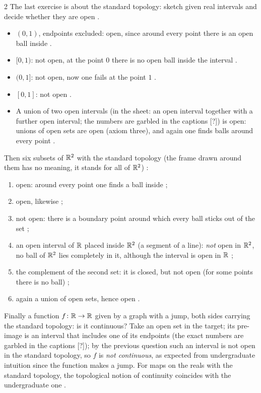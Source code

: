 \begin{paracol}{2}
The last exercise is about the standard topology: sketch given real intervals and decide whether they are open .
\begin{itemize}
  \item $(0,1)$, endpoints excluded: open, since around every point there is an open ball inside .
  \item $[0,1)$: not open, at the point $0$ there is no open ball inside the interval .
  \item $(0,1]$: not open, now one fails at the point $1$ .
  \item $[0,1]$: not open .
  \item A union of two open intervals (in the sheet: an open interval together with a further open interval; the numbers are garbled in the captions [?]) is open: unions of open sets are open (axiom three), and
        again one finds balls around every point .
\end{itemize}
Then six subsets of $\mathbb{R}^2$ with the standard topology (the frame drawn around them has no meaning, it stands for all of $\mathbb{R}^2$) :
\begin{enumerate}
  \item open: around every point one finds a ball inside ;
  \item open, likewise ;
  \item not open: there is a boundary point around which every ball sticks out of the set ;
  \item an open interval of $\mathbb{R}$ placed inside $\mathbb{R}^2$ (a segment of a line): \emph{not} open in $\mathbb{R}^2$, no ball of $\mathbb{R}^2$ lies completely in it, although the interval is open in $\mathbb{R}$ ;
  \item the complement of the second set: it is closed, but not open (for some points there is no ball) ;
  \item again a union of open sets, hence open .
\end{enumerate}
Finally a function $f\colon\mathbb{R}\to\mathbb{R}$ given by a graph with a jump, both sides carrying the standard topology: is it continuous? Take an open set in the target; its pre-image
is an interval that includes one of its endpoints (the exact numbers are garbled in the captions [?]); by the previous question such an interval is not open in the standard topology, so $f$ is
\emph{not continuous}, as expected from undergraduate intuition since the function makes a jump. For maps on the reals with the standard topology, the topological notion of continuity coincides with
the undergraduate one .


\end{paracol}
